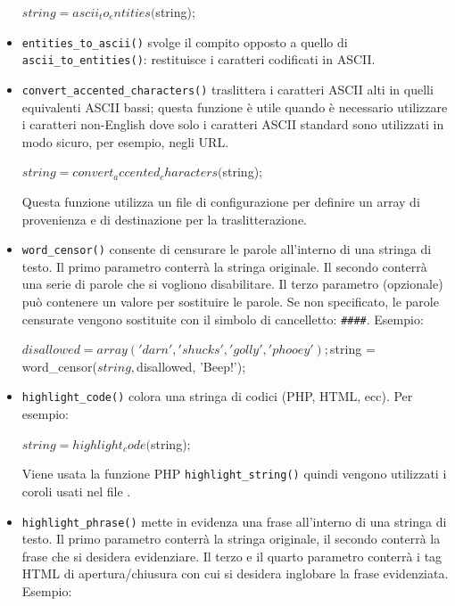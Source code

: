 \begin{itemize}
\begin{code}
$string = ascii_to_entities($string);
\end{code}

\item \verb|entities_to_ascii()| svolge il compito opposto a quello di \verb|ascii_to_entities()|: restituisce i caratteri codificati in ASCII.

\item \verb|convert_accented_characters()| traslittera i caratteri ASCII alti in quelli equivalenti ASCII bassi; questa funzione è utile quando è necessario utilizzare i caratteri non-English dove solo i caratteri ASCII standard sono utilizzati in modo sicuro, per esempio, negli \ac{URL}.

\begin{code}
$string = convert_accented_characters($string);
\end{code}

Questa funzione utilizza un file di configurazione  per definire un array di provenienza e di destinazione per la traslitterazione.

\item \verb|word_censor()| consente di censurare le parole all'interno di una stringa di testo. Il primo parametro conterrà la stringa originale. Il secondo conterrà una serie di parole che si vogliono disabilitare. Il terzo parametro (opzionale) può contenere un valore per sostituire le parole. Se non specificato, le parole censurate vengono sostituite con il simbolo di cancelletto: \verb|####|. Esempio:

\begin{code}
$disallowed = array('darn', 'shucks', 'golly', 'phooey');

$string = word_censor($string, $disallowed, 'Beep!');
\end{code}

\item \verb|highlight_code()| colora una stringa di codici (PHP, HTML, ecc). Per esempio:

\begin{code}
$string = highlight_code($string);
\end{code}

Viene usata la funzione PHP \verb|highlight_string()| quindi vengono utilizzati i coroli usati nel file .

\item \verb|highlight_phrase()| mette in evidenza una frase all'interno di una stringa di testo. Il primo parametro conterrà la stringa originale, il secondo conterrà la frase che si desidera evidenziare. Il terzo e il quarto parametro conterrà i tag \ac{HTML} di apertura/chiusura con cui si desidera inglobare la frase evidenziata. Esempio:


\end{itemize}
